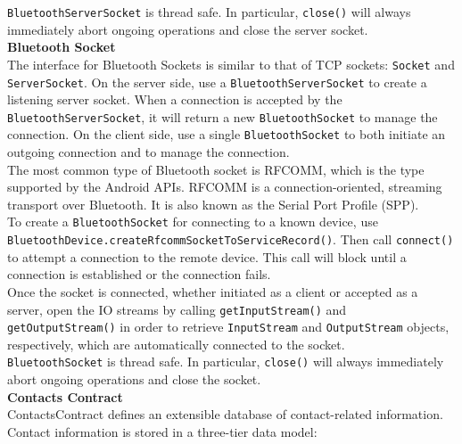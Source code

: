 \hspace*{0.82cm}\texttt{BluetoothServerSocket} is thread safe. In particular, \texttt{close()} will always immediately abort ongoing 
operations and close the server socket.\\[1cm]
\textbf{Bluetooth Socket}\\
\hspace*{0.82cm}The interface for Bluetooth Sockets is similar to that of TCP sockets: \texttt{Socket} and \texttt{ServerSocket}. On the 
server side, use a \texttt{BluetoothServerSocket} to create a listening server socket. When a connection is accepted by the 
\texttt{BluetoothServerSocket}, it will return a new \texttt{BluetoothSocket} to manage the connection. On the client side, use a single 
\texttt{BluetoothSocket} to both initiate an outgoing connection and to manage the connection.\\[0.5cm]
\hspace*{0.82cm}The most common type of Bluetooth socket is RFCOMM, which is the type supported by the Android APIs. RFCOMM is a 
connection-oriented, streaming transport over Bluetooth. It is also known as the Serial Port Profile (SPP).\\[0.5cm]
\hspace*{0.82cm}To create a \texttt{BluetoothSocket} for connecting to a known device, use\\
\texttt{BluetoothDevice.createRfcommSocketToServiceRecord()}. Then call \texttt{connect()} to attempt a connection to the remote device. 
This call will block until a connection is established or the connection fails.\\[0.5cm]
\hspace*{0.82cm}Once the socket is connected, whether initiated as a client or accepted as a server, open the IO streams by calling 
\texttt{getInputStream()} and \texttt{getOutputStream()} in order to retrieve \texttt{InputStream} and \texttt{OutputStream} objects, 
respectively, which are automatically connected to the socket.\\[0.5cm]
\hspace*{0.82cm}\texttt{BluetoothSocket} is thread safe. In particular, \texttt{close()} will always immediately abort ongoing operations 
and close the socket.\\[1cm]
\textbf{Contacts Contract}\\
\hspace*{0.82cm}ContactsContract defines an extensible database of contact-related information. Contact information is stored in a 
three-tier data model:
